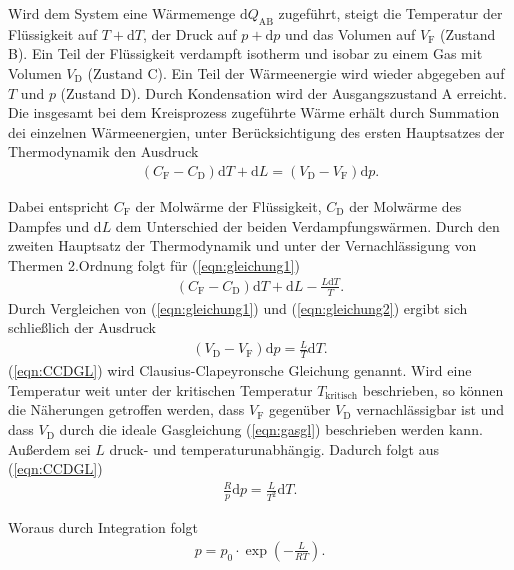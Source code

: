 \noindent
Wird dem System eine Wärmemenge $\mathrm{d}{Q_{\text{AB}}}$ zugeführt, steigt die Temperatur der Flüssigkeit auf 
$T+\mathrm{d}T$, der Druck auf $p+\mathrm{d}p$ und das Volumen auf  $V_{\text{F}}$ (Zustand B). Ein Teil der Flüssigkeit verdampft 
isotherm und isobar zu einem Gas mit Volumen $V_{\text{D}}$ (Zustand C). Ein Teil der Wärmeenergie wird wieder abgegeben auf $T$ 
und $p$ (Zustand D). Durch Kondensation wird der Ausgangszustand A erreicht.
\\

\noindent
Die insgesamt bei dem Kreisprozess zugeführte Wärme erhält durch Summation dei einzelnen Wärmeenergien, unter Berücksichtigung des 
ersten Hauptsatzes der Thermodynamik den Ausdruck 
\begin{align}
    \label{eqn:gleichung1}
    (C_{\text{F}} - C_{\text{D}}) \mathrm{d}T + \mathrm{d}L = (V_{\text{D}} - V_{\text{F}}) \mathrm{d}p.
\end{align}

\noindent
Dabei entspricht $C_{\text{F}}$ der Molwärme der Flüssigkeit, $C_{\text{D}}$ der Molwärme des Dampfes und $\mathrm{d}L$ dem Unterschied 
der beiden Verdampfungswärmen. %
Durch den zweiten Hauptsatz der Thermodynamik und unter der Vernachlässigung von Thermen 2.Ordnung folgt für (\ref{eqn:gleichung1})
\begin{align}
    (C_{\text{F}} - C_{\text{D}}) \mathrm{d}T + \mathrm{d}L - \frac{L\mathrm{d}T}{T}.
    \label{eqn:gleichung2}
\end{align}
Durch Vergleichen von (\ref{eqn:gleichung1}) und (\ref{eqn:gleichung2}) ergibt sich schließlich der Ausdruck
\begin{align}
    \label{eqn:CCDGL}
    (V_{\text{D}} - V_{\text{F}}) \mathrm{d}p = \frac{L}{T} \mathrm{d}T.
\end{align}
(\ref{eqn:CCDGL}) wird Clausius-Clapeyronsche Gleichung genannt. Wird eine Temperatur weit unter der kritischen Temperatur
$T_{\text{kritisch}}$ beschrieben, so können die Näherungen getroffen werden, dass $V_{\text{F}}$ gegenüber $V_{\text{D}}$ vernachlässigbar
ist und dass $V_{\text{D}}$ durch die ideale Gasgleichung (\ref{eqn:gasgl}) beschrieben werden kann. Außerdem sei $L$ druck- und
temperaturunabhängig. Dadurch folgt aus (\ref{eqn:CCDGL})
\begin{align*}
    \frac{R}{p}\mathrm{d}p=\frac{L}{T^2} \mathrm{d}T.
\end{align*}

\noindent
Woraus durch Integration folgt
\begin{align}
    \label{eqn:expo}
    p = p_0\cdot \exp(-\frac{L}{RT}).
\end{align}